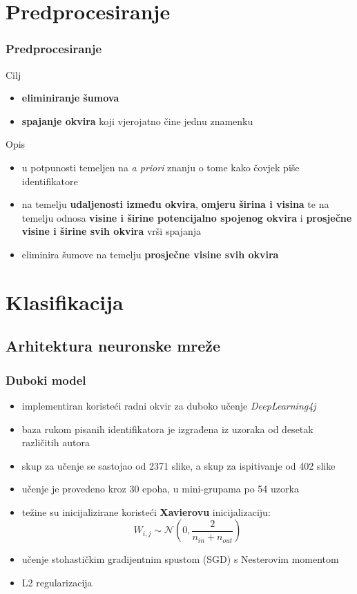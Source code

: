 \documentclass{beamer}
\begin{document}
\section{Predprocesiranje}
\begin{frame}
	\frametitle{Predprocesiranje}
	Cilj
	\begin{itemize}
		\item \textbf{eliminiranje šumova}
		\item \textbf{spajanje okvira} koji vjerojatno čine jednu znamenku
	\end{itemize}
	Opis
	\begin{itemize}
			\item u potpunosti temeljen na \textit{a priori} znanju o tome kako čovjek piše identifikatore 
			\item na temelju \textbf{udaljenosti između okvira}, \textbf{omjeru širina i visina} te na temelju odnosa \textbf{visine i širine potencijalno spojenog okvira} i \textbf{prosječne visine i širine svih okvira} vrši spajanja
			\item eliminira šumove na temelju \textbf{prosječne visine svih okvira}
	\end{itemize}

\end{frame}


\section{Klasifikacija}
\subsection{Arhitektura neuronske mreže}
\begin{frame}
	\frametitle{Duboki model}
	\begin{itemize}
		\item implementiran koristeći radni okvir za duboko učenje \textit{DeepLearning4j}
		\item  baza rukom pisanih identifikatora je izgrađena iz uzoraka od desetak različitih autora
		\item skup za učenje se sastojao od 2371 slike, a skup za ispitivanje od 402 slike
		\item učenje je provedeno kroz 30 epoha, u mini-grupama po 54 uzorka
		\item težine su inicijalizirane koristeći \textbf{Xavierovu} inicijalizaciju:  \begin{equation}
		W_{i, j} \sim \mathcal{N}(0, \frac{2}{n_{in} + n_{out}})
		\end{equation} 
		\item učenje stohastičkim gradijentnim spustom (SGD) s Nesterovim momentom
		\item L2 regularizacija
	\end{itemize}
\end{frame}
\end{document}
